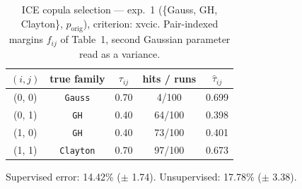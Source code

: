 \begin{table}[htbp]
  \centering
  \caption{ICE copula selection — exp.\ 1 (\{Gauss, GH, Clayton\}, $p_{\text{orig}}$), criterion: xvcic. Pair-indexed margins $f_{ij}$ of Table~1, second Gaussian parameter read as a variance.}
  \label{tab:exp3-exp1_orig_p__xvcic}
  \begin{tabular}{ccccc}
    \toprule
    $(i, j)$ & true family & $\tau_{ij}$ & hits / runs & $\hat\tau_{ij}$ \\
    \midrule
    (0, 0) & \texttt{Gauss} & 0.70 & 4/100 & 0.699 \\
    (0, 1) & \texttt{GH} & 0.40 & 64/100 & 0.398 \\
    (1, 0) & \texttt{GH} & 0.40 & 73/100 & 0.401 \\
    (1, 1) & \texttt{Clayton} & 0.70 & 97/100 & 0.673 \\
    \bottomrule
  \end{tabular}
  \par\smallskip Supervised error: 14.42\% ($\pm$ 1.74). Unsupervised: 17.78\% ($\pm$ 3.38).
\end{table}
